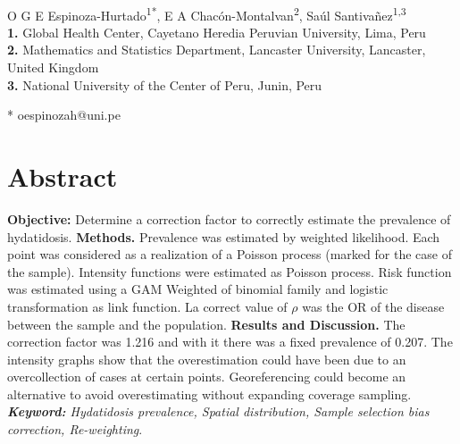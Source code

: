 \documentclass[10pt,letterpaper]{article}
\begin{document}
\vspace*{0.2in}

\justify

\begin{flushleft}
{\Large
\textbf{} %
}
\newline
\\
O G E Espinoza-Hurtado\textsuperscript{1*},
E A Chacón-Montalvan\textsuperscript{2},
Saúl Santivañez\textsuperscript{1,3}
\\
\bigskip
\textbf{1.} Global Health Center, Cayetano Heredia Peruvian University, Lima, Peru
\\
\textbf{2.} Mathematics and Statistics Department, Lancaster University, Lancaster, United Kingdom
\\
\textbf{3.} National University of the Center of Peru, Junin,  Peru
\\

\bigskip

* oespinozah@uni.pe

\end{flushleft}

\section*{Abstract}
\textbf{Objective:} Determine a correction factor to correctly estimate the prevalence of hydatidosis. \textbf{Methods.} Prevalence was estimated by weighted likelihood. Each point was considered as a realization of a Poisson process (marked for the case of the sample). Intensity functions were estimated as Poisson process. Risk function was estimated using a GAM Weighted of binomial family and logistic transformation as link function. La correct value of $\rho$ was the OR of the disease between the sample and the population. \textbf{Results and Discussion.} The correction factor was 1.216 and with it there was a fixed prevalence of 0.207. The intensity graphs show that the overestimation could have been due to an overcollection of cases at certain points. Georeferencing could become an alternative to avoid overestimating without expanding coverage sampling. \textit{\textbf{Keyword:} Hydatidosis prevalence, Spatial distribution, Sample selection bias correction, Re-weighting}.
\end{document}
